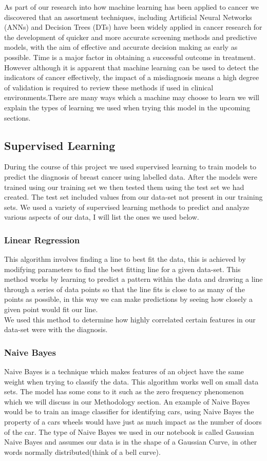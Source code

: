 \documentclass[conference]{IEEEtran}
\begin{document}
As part of our research into how machine learning has been applied to cancer we discovered that an assortment techniques, including Artificial Neural Networks (ANNs) and Decision Trees (DTs) have been widely applied in cancer research for the development of quicker and more accurate screening methods and predictive models, with the aim of effective and accurate decision making as early as possible. Time is a major factor in obtaining a successful outcome in treatment. However although it is apparent that machine learning can be used to detect the indicators of cancer effectively, the impact of a misdiagnosis means a high degree of validation is required to review these methods if used in clinical environments.There are many ways which a machine may choose to learn we will explain the types of learning we used when trying this model in the upcoming sections.

\subsection{Supervised Learning}
During the course of this project we used supervised learning to train models to predict the diagnosis of breast cancer using labelled data.  After the models were trained using our training set we then tested them using the test set we had created. The test set included values from our data-set not present in our training sets. We used a variety of supervised learning methods to predict and analyze various aspects of our data, I will list the ones we used below. 
\vspace{2mm}
\subsubsection{Linear Regression}
This algorithm involves finding a line to best fit the data, this is achieved by modifying parameters to find the best fitting line for a given data-set. This method works by learning to predict a pattern within the data and drawing a line through a series of data points so that the line fits is close to as many of the points as possible, in this way we can make predictions by seeing how closely a given point would fit our line.  
\\
We used this method to determine how highly correlated certain features in our data-set were with the diagnosis.
\vspace{2mm}
\subsubsection{Naive Bayes}
Naive Bayes is a technique which makes features of an object have the same weight when trying to classify the data.  This algorithm works well on small data sets.  The model has some cons to it such as the zero frequency phenomenon which we will discuss in our Methodology section.  An example of Naive Bayes would be to train an image classifier for identifying cars, using Naive Bayes the property of a cars wheels would have just as much impact as the number of doors of the car.  The type of Naive Bayes we used in our notebook is called Gaussian Naive Bayes and assumes our data is in the shape of a Gaussian Curve, in other words normally distributed(think of a bell curve).
\end{document}
